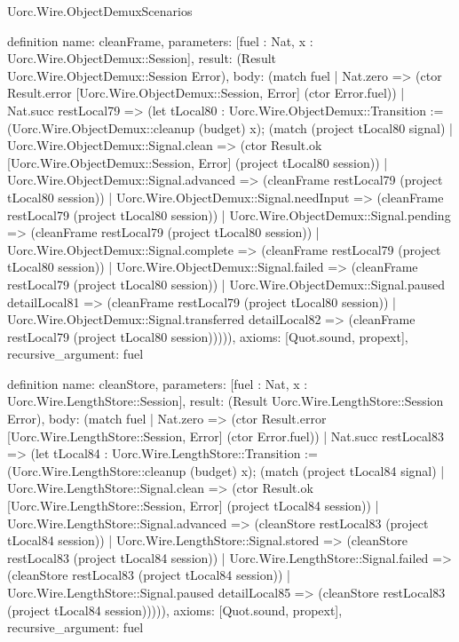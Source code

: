 \begin{lexlean}{Uorc.Wire.ObjectDemuxScenarios}
\begin{semanticmodule}
definition{
  name: cleanFrame,
  parameters: [fuel : Nat, x : Uorc.Wire.ObjectDemux::Session],
  result: (Result Uorc.Wire.ObjectDemux::Session Error),
  body: (match fuel
    | Nat.zero => (ctor Result.error [Uorc.Wire.ObjectDemux::Session, Error] (ctor Error.fuel))
    | Nat.succ restLocal79 => (let tLocal80 : Uorc.Wire.ObjectDemux::Transition := (Uorc.Wire.ObjectDemux::cleanup (budget) x); (match (project tLocal80 signal)
      | Uorc.Wire.ObjectDemux::Signal.clean => (ctor Result.ok [Uorc.Wire.ObjectDemux::Session, Error] (project tLocal80 session))
      | Uorc.Wire.ObjectDemux::Signal.advanced => (cleanFrame restLocal79 (project tLocal80 session))
      | Uorc.Wire.ObjectDemux::Signal.needInput => (cleanFrame restLocal79 (project tLocal80 session))
      | Uorc.Wire.ObjectDemux::Signal.pending => (cleanFrame restLocal79 (project tLocal80 session))
      | Uorc.Wire.ObjectDemux::Signal.complete => (cleanFrame restLocal79 (project tLocal80 session))
      | Uorc.Wire.ObjectDemux::Signal.failed => (cleanFrame restLocal79 (project tLocal80 session))
      | Uorc.Wire.ObjectDemux::Signal.paused detailLocal81 => (cleanFrame restLocal79 (project tLocal80 session))
      | Uorc.Wire.ObjectDemux::Signal.transferred detailLocal82 => (cleanFrame restLocal79 (project tLocal80 session))))),
  axioms: [Quot.sound, propext],
  recursive_argument: fuel
}

definition{
  name: cleanStore,
  parameters: [fuel : Nat, x : Uorc.Wire.LengthStore::Session],
  result: (Result Uorc.Wire.LengthStore::Session Error),
  body: (match fuel
    | Nat.zero => (ctor Result.error [Uorc.Wire.LengthStore::Session, Error] (ctor Error.fuel))
    | Nat.succ restLocal83 => (let tLocal84 : Uorc.Wire.LengthStore::Transition := (Uorc.Wire.LengthStore::cleanup (budget) x); (match (project tLocal84 signal)
      | Uorc.Wire.LengthStore::Signal.clean => (ctor Result.ok [Uorc.Wire.LengthStore::Session, Error] (project tLocal84 session))
      | Uorc.Wire.LengthStore::Signal.advanced => (cleanStore restLocal83 (project tLocal84 session))
      | Uorc.Wire.LengthStore::Signal.stored => (cleanStore restLocal83 (project tLocal84 session))
      | Uorc.Wire.LengthStore::Signal.failed => (cleanStore restLocal83 (project tLocal84 session))
      | Uorc.Wire.LengthStore::Signal.paused detailLocal85 => (cleanStore restLocal83 (project tLocal84 session))))),
  axioms: [Quot.sound, propext],
  recursive_argument: fuel
}


\end{semanticmodule}
\end{lexlean}
